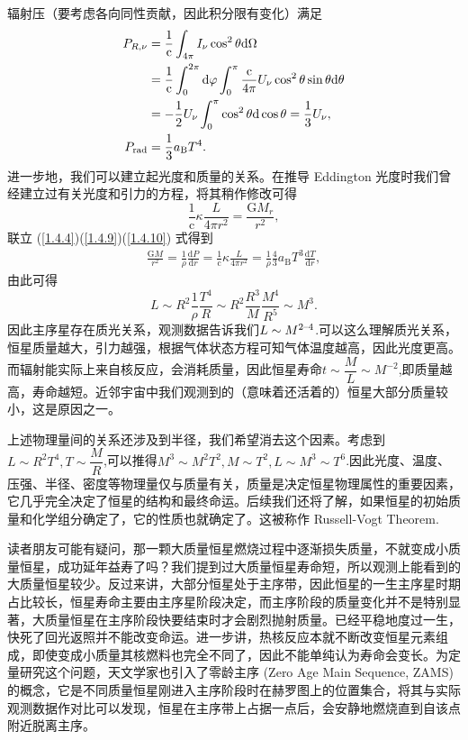 \documentclass[../天体物理基础.tex]{subfiles}
\begin{document}
辐射压（要考虑各向同性贡献，因此积分限有变化）满足
\begin{align}
P_{R,\nu}&=\frac{1}{\mathrm{c}}\int_{4\pi{}}I_{\nu}\cos^{2}\theta\mathrm{d}\Omega\notag\\
&=\frac{1}{\mathrm{c}}\int_{0}^{2\pi{}}\mathrm{d}\varphi\int_{0}^{\pi}\frac{\mathrm{c}}{4\pi{}}U_{\nu}\cos^{2}\theta\sin\theta\mathrm{d}\theta\notag\\
&=-\frac{1}{2}U_{\nu}\int_{0}^{\pi}\cos^{2}\theta\mathrm{d}\cos\theta=\frac{1}{3}U_{\nu},\notag\\
P_{\text{rad}}&=\frac{1}{3}a_{\text{B}}T^{4}.\label{1.4.9}
\end{align}
进一步地，我们可以建立起光度和质量的关系。在推导 Eddington 光度时我们曾经建立过有关光度和引力的方程，将其稍作修改可得
\begin{equation}
\frac{1}{\mathrm{c}}\kappa\frac{L}{4\pi r^{2}}=\frac{\mathrm{G}M_{r}}{r^{2}},\label{1.4.10}
\end{equation}
联立 (\ref{1.4.4})(\ref{1.4.9})(\ref{1.4.10}) 式得到
\begin{align}
\frac{\mathrm{G}M}{r^{2}}=\frac{1}{\rho}\frac{\mathrm{d}P}{\mathrm{d}r}=\frac{1}{\mathrm{c}}\kappa\frac{L}{4\pi r^{2}}=\frac{1}{\rho}\frac{4}{3}a_{\text{B}}T^{3}\frac{\mathrm{d}T}{\mathrm{d}r},\label{1.4.11}
\end{align}
由此可得
\begin{equation}
L\sim R^{2}\frac{1}{\rho}\frac{T^{4}}{R}\sim R^{2}\frac{R^{3}}{M}\frac{M^{4}}{R^{5}}\sim M^{3}.
\end{equation}
因此主序星存在质光关系，观测数据告诉我们$L\sim M^{2\text{\textendash}4}$.可以这么理解质光关系，恒星质量越大，引力越强，根据气体状态方程可知气体温度越高，因此光度更高。而辐射能实际上来自核反应，会消耗质量，因此恒星寿命$t\sim\dfrac{M}{L}\sim M^{-2}$,即质量越高，寿命越短。近邻宇宙中我们观测到的（意味着还活着的）恒星大部分质量较小，这是原因之一。

上述物理量间的关系还涉及到半径，我们希望消去这个因素。考虑到$L\sim R^{2}T^{4},T\sim\dfrac{M}{R}$,可以推得$M^{3}\sim M^{2}T^{2},M\sim T^{2},L\sim M^{3}\sim T^{6}$.因此光度、温度、压强、半径、密度等物理量仅与质量有关，质量是决定恒星物理属性的重要因素，它几乎完全决定了恒星的结构和最终命运。后续我们还将了解，如果恒星的初始质量和化学组分确定了，它的性质也就确定了。这被称作 Russell-Vogt Theorem.

读者朋友可能有疑问，那一颗大质量恒星燃烧过程中逐渐损失质量，不就变成小质量恒星，成功延年益寿了吗？我们提到过大质量恒星寿命短，所以观测上能看到的大质量恒星较少。反过来讲，大部分恒星处于主序带，因此恒星的一生主序星时期占比较长，恒星寿命主要由主序星阶段决定，而主序阶段的质量变化并不是特别显著，大质量恒星在主序阶段快要结束时才会剧烈抛射质量。已经平稳地度过一生，快死了回光返照并不能改变命运。进一步讲，热核反应本就不断改变恒星元素组成，即使变成小质量其核燃料也完全不同了，因此不能单纯认为寿命会变长。为定量研究这个问题，天文学家也引入了零龄主序 (Zero Age Main Sequence, ZAMS) 的概念，它是不同质量恒星刚进入主序阶段时在赫罗图上的位置集合，将其与实际观测数据作对比可以发现，恒星在主序带上占据一点后，会安静地燃烧直到自该点附近脱离主序。
\end{document}
